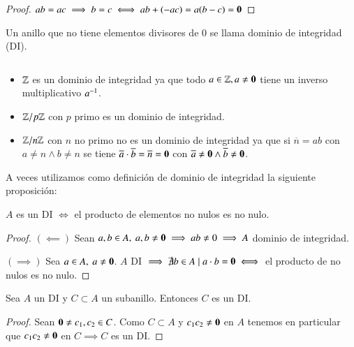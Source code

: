 \begin{proof}
	$ab = ac \implies b = c \iff ab + (-ac) = a(b -c) = \mathbf{0}$
\end{proof}

\begin{dfn}
	Un anillo que no tiene elementos divisores de 0 se llama dominio de integridad (DI).
\end{dfn}

\begin{ej}$ $\newline
	\begin{itemize}
		\item $\mathbb{Z}$ es un dominio de integridad ya que todo $a \in \mathbb{Z}, a \neq \mathbf{0}$ tiene un inverso multiplicativo $a^{-1}$.
		\item $\mathbb{Z}/p\mathbb{Z}$ con $p$ primo es un dominio de integridad.
		\item $\mathbb{Z}/n\mathbb{Z}$ con $n$ no primo no es un dominio de integridad ya que si $\overline n = ab$ con $a \neq n \land b \neq n$ se tiene $\overline{a} \cdot \overline{b} = \overline{n} = \mathbf{0}$ con $\overline{a} \neq \mathbf{0} \land \overline{b} \neq \mathbf{0}$.
	\end{itemize}
\end{ej}


A veces utilizamos como definición de dominio de integridad la siguiente proposición:

\begin{pro}
	$A$ es un DI $\iff$ el producto de elementos no nulos es no nulo.
\end{pro}

\begin{proof}
	$(\impliedby)$ Sean $a,b \in A,\ a,b \neq \mathbf{0} \implies ab \neq 0 \implies A$ dominio de integridad.
	
	$(\implies)$ Sea $a \in A,\ a \neq \mathbf{0}$. $A$ DI $\implies \nexists b \in A \mid a\cdot b = \mathbf{0} \iff$ el producto de no nulos es no nulo.
\end{proof}

\begin{pro}
	Sea $A$ un DI y $C \subset A$ un subanillo. Entonces $C$ es un DI.
\end{pro}

\begin{proof}
	Sean $\mathbf{0} \neq c_1, c_2 \in C$. Como $C \subset A$ y $c_1c_2 \neq \mathbf{0}$ en $A$ tenemos en particular que $c_1 c_2 \neq \mathbf{0}$ en $C \implies C$ es un DI.
\end{proof}

